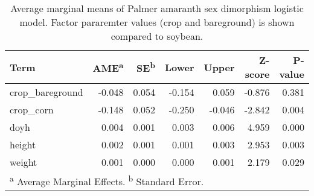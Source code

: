 \begin{table}[!h]

\caption{\label{tab:unnamed-chunk-3}Average marginal means of Palmer amaranth sex dimorphism logistic model. Factor pararemter values (crop and bareground) is shown compared to soybean.}
\centering
\fontsize{10}{12}\selectfont
\begin{tabular}[t]{lrrrrrr}
\toprule
Term & AME\textsuperscript{a} & SE\textsuperscript{b} & Lower & Upper & Z-score & P-value\\
\midrule
crop\_bareground & -0.048 & 0.054 & -0.154 & 0.059 & -0.876 & 0.381\\

crop\_corn & -0.148 & 0.052 & -0.250 & -0.046 & -2.842 & 0.004\\

doyh & 0.004 & 0.001 & 0.003 & 0.006 & 4.959 & 0.000\\

height & 0.002 & 0.001 & 0.001 & 0.003 & 2.953 & 0.003\\

weight & 0.001 & 0.000 & 0.000 & 0.001 & 2.179 & 0.029\\
\bottomrule
\multicolumn{7}{l}{\rule{0pt}{1em}\textsuperscript{a} Average Marginal Effects. \textsuperscript{b} Standard Error.}\\
\end{tabular}
\end{table}